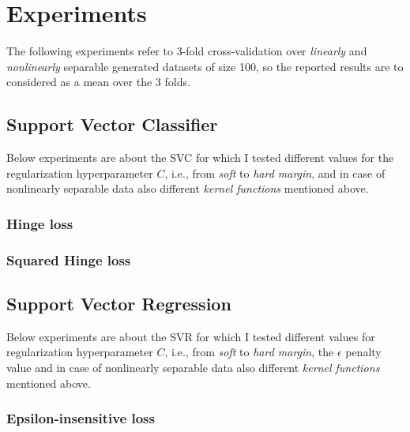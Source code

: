 \section{Experiments}

The following experiments refer to 3-fold cross-validation over \emph{linearly} and \emph{nonlinearly} separable generated datasets of size 100, so the reported results are to considered as a mean over the 3 folds.

\subsection{Support Vector Classifier}

Below experiments are about the SVC for which I tested different values for the regularization hyperparameter $C$, i.e., from \emph{soft} to \emph{hard margin}, and in case of nonlinearly separable data also different \emph{kernel functions} mentioned above.

\subsubsection{Hinge loss}











\subsubsection{Squared Hinge loss}



\subsection{Support Vector Regression}

Below experiments are about the SVR for which I tested different values for regularization hyperparameter $C$, i.e., from \emph{soft} to \emph{hard margin}, the $\epsilon$ penalty value and in case of nonlinearly separable data also different \emph{kernel functions} mentioned above.

\subsubsection{Epsilon-insensitive loss}


